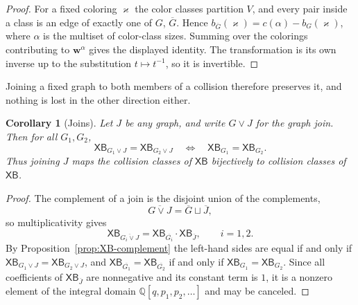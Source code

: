 \documentclass[11pt]{article}
\theoremstyle{plain}
\newtheorem{corollary}[theorem]{Corollary}
\theoremstyle{definition}
\newcommand{\bw}{\mathbf{w}}
\newcommand{\XB}{\mathsf{XB}} %
\newcommand{\kp}{\varkappa}
\newcommand{\QQ}{\mathbb Q}
\numberwithin{equation}{section}
\begin{document}
\begin{proof}
For a fixed coloring $\kp$ the color classes partition $V$, and every
pair inside a class is an edge of exactly one of $G$, $\overline G$.  Hence
$b_{\overline G}(\kp)=c(\alpha)-b_G(\kp)$, where $\alpha$ is the
multiset of color-class sizes.  Summing over the colorings contributing to
$\bw^{\alpha}$ gives the displayed identity.  The transformation is its
own inverse up to the substitution $t\mapsto t^{-1}$, so it is invertible.
\end{proof}

Joining a fixed graph to both members of a collision therefore preserves it,
and nothing is lost in the other direction either.

\begin{corollary}[Joins]\label{cor:join-equivalence}
Let $J$ be any graph, and write $G\vee J$ for the graph join.  Then for all
$G_1,G_2$,
\begin{equation}\label{eq:join-equivalence}
   \XB_{G_1\vee J}=\XB_{G_2\vee J}
   \quad\Longleftrightarrow\quad
   \XB_{G_1}=\XB_{G_2}.
\end{equation}
Thus joining $J$ maps the collision classes of $\XB$ bijectively to collision
classes of $\XB$.
\end{corollary}

\begin{proof}
The complement of a join is the disjoint union of the complements,
\[
  \overline{G\vee J}=\overline G\sqcup\overline J,
\]
so multiplicativity gives
\[
   \XB_{\overline{G_i\vee J}}
   =\XB_{\overline{G_i}}\cdot \XB_{\overline J},
   \qquad i=1,2.
\]
By Proposition~\ref{prop:XB-complement} the left-hand sides are equal if and
only if $\XB_{G_1\vee J}=\XB_{G_2\vee J}$, and $\XB_{\overline{G_1}}=
\XB_{\overline{G_2}}$ if and only if $\XB_{G_1}=\XB_{G_2}$.  Since all
coefficients of $\XB_{\overline J}$ are nonnegative and its constant term is
$1$, it is a nonzero element of the integral domain
$\QQ[q,p_1,p_2,\ldots]$ and may be canceled.
\end{proof}
\end{document}
